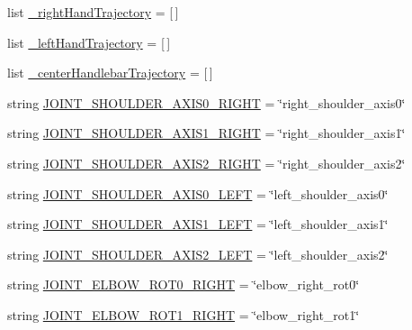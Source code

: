 \begin{DoxyCompactItemize}
list \mbox{\hyperlink{namespacecapture__steering__trajectory_a6589685d6fe12cc5e56d82c773d38dad}{\+\_\+right\+Hand\+Trajectory}} = \mbox{[}$\,$\mbox{]}
\item 
list \mbox{\hyperlink{namespacecapture__steering__trajectory_a570f5ac45ab2a6b7a1e62d48615d20b1}{\+\_\+left\+Hand\+Trajectory}} = \mbox{[}$\,$\mbox{]}
\item 
list \mbox{\hyperlink{namespacecapture__steering__trajectory_a33928ef90588372b659d20aadb296c5b}{\+\_\+center\+Handlebar\+Trajectory}} = \mbox{[}$\,$\mbox{]}
\item 
string \mbox{\hyperlink{namespacecapture__steering__trajectory_a942ca1b79a6dd339e79173470f3a87ce}{J\+O\+I\+N\+T\+\_\+\+S\+H\+O\+U\+L\+D\+E\+R\+\_\+\+A\+X\+I\+S0\+\_\+\+R\+I\+G\+HT}} = \char`\"{}right\+\_\+shoulder\+\_\+axis0\char`\"{}
\item 
string \mbox{\hyperlink{namespacecapture__steering__trajectory_a7e3fc34906ede0a5db1aba54bb08e7a5}{J\+O\+I\+N\+T\+\_\+\+S\+H\+O\+U\+L\+D\+E\+R\+\_\+\+A\+X\+I\+S1\+\_\+\+R\+I\+G\+HT}} = \char`\"{}right\+\_\+shoulder\+\_\+axis1\char`\"{}
\item 
string \mbox{\hyperlink{namespacecapture__steering__trajectory_a2674b3d6cebe7c7d20231ae1d2572d25}{J\+O\+I\+N\+T\+\_\+\+S\+H\+O\+U\+L\+D\+E\+R\+\_\+\+A\+X\+I\+S2\+\_\+\+R\+I\+G\+HT}} = \char`\"{}right\+\_\+shoulder\+\_\+axis2\char`\"{}
\item 
string \mbox{\hyperlink{namespacecapture__steering__trajectory_ad4cc92f248a0723a093efc2cecff603a}{J\+O\+I\+N\+T\+\_\+\+S\+H\+O\+U\+L\+D\+E\+R\+\_\+\+A\+X\+I\+S0\+\_\+\+L\+E\+FT}} = \char`\"{}left\+\_\+shoulder\+\_\+axis0\char`\"{}
\item 
string \mbox{\hyperlink{namespacecapture__steering__trajectory_a56dc577f56d1a0b7ea13973de1e862ee}{J\+O\+I\+N\+T\+\_\+\+S\+H\+O\+U\+L\+D\+E\+R\+\_\+\+A\+X\+I\+S1\+\_\+\+L\+E\+FT}} = \char`\"{}left\+\_\+shoulder\+\_\+axis1\char`\"{}
\item 
string \mbox{\hyperlink{namespacecapture__steering__trajectory_aa0834affc61767ddb7932805e0b0c49b}{J\+O\+I\+N\+T\+\_\+\+S\+H\+O\+U\+L\+D\+E\+R\+\_\+\+A\+X\+I\+S2\+\_\+\+L\+E\+FT}} = \char`\"{}left\+\_\+shoulder\+\_\+axis2\char`\"{}
\item 
string \mbox{\hyperlink{namespacecapture__steering__trajectory_a4988aec633d008760edaa5d28f3e4125}{J\+O\+I\+N\+T\+\_\+\+E\+L\+B\+O\+W\+\_\+\+R\+O\+T0\+\_\+\+R\+I\+G\+HT}} = \char`\"{}elbow\+\_\+right\+\_\+rot0\char`\"{}
\item 
string \mbox{\hyperlink{namespacecapture__steering__trajectory_ae9fa46c834e1b3db6ce3422160c5987d}{J\+O\+I\+N\+T\+\_\+\+E\+L\+B\+O\+W\+\_\+\+R\+O\+T1\+\_\+\+R\+I\+G\+HT}} = \char`\"{}elbow\+\_\+right\+\_\+rot1\char`\"{}

\end{DoxyCompactItemize}

